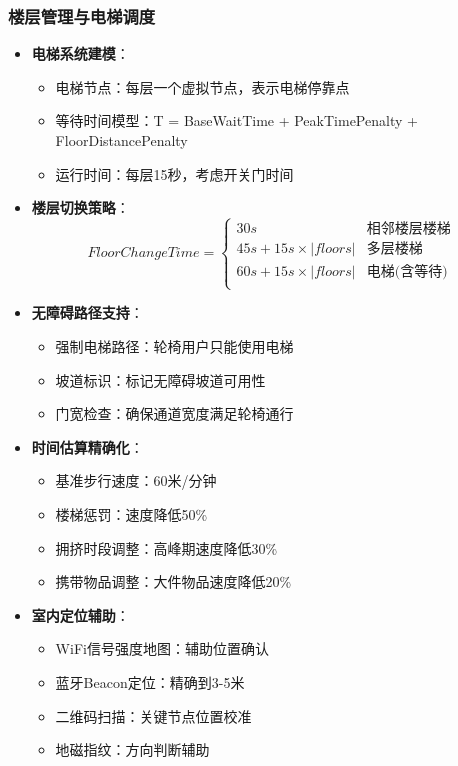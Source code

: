 \documentclass[12pt,a4paper]{article}
\begin{document}
\subsubsection{楼层管理与电梯调度}
\begin{itemize}
    \item \textbf{电梯系统建模}：
    \begin{itemize}
        \item 电梯节点：每层一个虚拟节点，表示电梯停靠点
        \item 等待时间模型：T = BaseWaitTime + PeakTimePenalty + FloorDistancePenalty
        \item 运行时间：每层15秒，考虑开关门时间
    \end{itemize}
    \item \textbf{楼层切换策略}：
    \[FloorChangeTime = \begin{cases}
    30s & \text{相邻楼层楼梯} \\
    45s + 15s \times |floors| & \text{多层楼梯} \\
    60s + 15s \times |floors| & \text{电梯(含等待)} \\
    \end{cases}\]
    \item \textbf{无障碍路径支持}：
    \begin{itemize}
        \item 强制电梯路径：轮椅用户只能使用电梯
        \item 坡道标识：标记无障碍坡道可用性
        \item 门宽检查：确保通道宽度满足轮椅通行
    \end{itemize}
    \item \textbf{时间估算精确化}：
    \begin{itemize}
        \item 基准步行速度：60米/分钟
        \item 楼梯惩罚：速度降低50\%
        \item 拥挤时段调整：高峰期速度降低30\%
        \item 携带物品调整：大件物品速度降低20\%
    \end{itemize}
    \item \textbf{室内定位辅助}：
    \begin{itemize}
        \item WiFi信号强度地图：辅助位置确认
        \item 蓝牙Beacon定位：精确到3-5米
        \item 二维码扫描：关键节点位置校准
        \item 地磁指纹：方向判断辅助
    \end{itemize}
\end{itemize}
\end{document}
